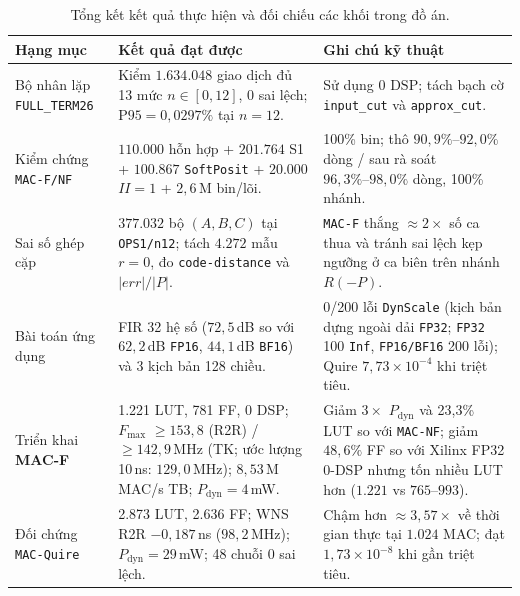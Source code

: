 \begin{table}[!htbp]
  \centering
  \small
  \renewcommand{\arraystretch}{1.10}
  \caption{Tổng kết kết quả thực hiện và đối chiếu các khối trong đồ án.}
  \label{tab:status}
  \begin{tabularx}{\textwidth}{@{}>{\raggedright\arraybackslash}p{31mm}Y Y@{}}
    \toprule
    Hạng mục & Kết quả đạt được & Ghi chú kỹ thuật \\
    \midrule
    Bộ nhân lặp \texttt{FULL\_TERM26} & Kiểm $1.634.048$ giao dịch đủ 13 mức $n \in [0, 12]$, 0 sai lệch; $\mathrm{P95}=0{,}0297\%$ tại $n=12$. &
      Sử dụng $0\text{ DSP}$; tách bạch cờ \texttt{input\_cut} và \texttt{approx\_cut}. \\
    Kiểm chứng \texttt{MAC-F/NF} & $110.000$ hỗn hợp + $201.764$ S1 + $100.867$ \texttt{SoftPosit} + $20.000$ $II=1$ + $2{,}6$\,M bin/lõi. &
      100\% bin; thô $90{,}9\%\text{--}92{,}0\%$ dòng / sau rà soát $96{,}3\%\text{--}98{,}0\%$ dòng, 100\% nhánh. \\
    Sai số ghép cặp & $377.032$ bộ $(A,B,C)$ tại \texttt{OPS1/n12}; tách $4.272$ mẫu $r=0$, đo \texttt{code-distance} và $|err|/|P|$. &
      \texttt{MAC-F} thắng $\approx 2\times$ số ca thua và tránh sai lệch kẹp ngưỡng ở ca biên trên nhánh $R(-P)$. \\
    Bài toán ứng dụng & FIR 32 hệ số ($72{,}5$\,dB so với $62{,}2$\,dB \texttt{FP16}, $44{,}1$\,dB \texttt{BF16}) và 3 kịch bản 128 chiều. &
      0/200 lỗi \texttt{DynScale} (kịch bản dựng ngoài dải \texttt{FP32}; \texttt{FP32} 100 \texttt{Inf}, \texttt{FP16/BF16} 200 lỗi); Quire $7{,}73{\times}10^{-4}$ khi triệt tiêu. \\
    Triển khai \textbf{MAC-F} & 1.221 LUT, 781 FF, 0 DSP; $F_{\max}$ $\ge 153{,}8$ (R2R) / $\ge 142{,}9$\,MHz (TK; ước lượng 10\,ns: $129{,}0$\,MHz); $8{,}53$\,M\,MAC/s TB; $P_{\mathrm{dyn}}=4$\,mW. &
      Giảm $3\times$ $P_{\mathrm{dyn}}$ và 23,3\% LUT so với \texttt{MAC-NF}; giảm $48{,}6\%$ FF so với Xilinx FP32 0-DSP nhưng tốn nhiều LUT hơn ($1.221$ vs $765\text{--}993$). \\
    Đối chứng \texttt{MAC-Quire} & 2.873 LUT, 2.636 FF; WNS R2R $-0{,}187$\,ns ($98{,}2$\,MHz); $P_{\mathrm{dyn}}=29$\,mW; 48 chuỗi 0 sai lệch. &
      Chậm hơn $\approx 3{,}57\times$ về thời gian thực tại $1.024$ MAC; đạt $1{,}73{\times}10^{-8}$ khi gần triệt tiêu. \\
    \bottomrule
  \end{tabularx}
\end{table}


